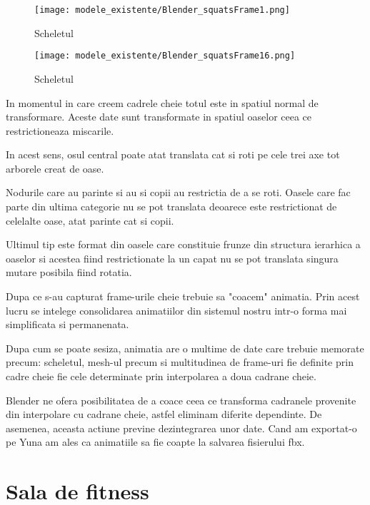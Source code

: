 \documentclass[12pt,a4paper]{report}
\begin{document}
\begin{figure}[th]
\centering
\texttt{[image: modele\_existente/Blender\_squatsFrame1.png]}
  \caption[Scheletul]{Scheletul\protect\footnotemark}
  \label{figure_1:picture_10}
\end{figure}

\begin{figure}[th]
\centering
\texttt{[image: modele\_existente/Blender\_squatsFrame16.png]}
  \caption[Scheletul]{Scheletul\protect\footnotemark}
  \label{figure_1:picture_10}
\end{figure}


In momentul in care creem cadrele cheie totul este in spatiul normal de transformare. Aceste date sunt transformate in spatiul oaselor ceea ce restrictioneaza miscarile. 

In acest sens, osul central poate atat translata cat si roti pe cele trei axe tot arborele creat de oase. 

Nodurile care au parinte si au si copii au restrictia de a se roti. Oasele care fac parte din ultima categorie nu se pot translata deoarece este restrictionat de celelalte oase, atat parinte cat si copii. 

Ultimul tip este format din oasele care constituie frunze din structura ierarhica a oaselor si acestea fiind restrictionate la un capat nu se pot translata singura mutare posibila fiind rotatia.

Dupa ce s-au capturat frame-urile cheie trebuie sa "coacem" animatia. Prin acest lucru se intelege consolidarea animatiilor din sistemul nostru intr-o forma mai simplificata si permanenata. 

Dupa cum se poate sesiza, animatia are o multime de date care trebuie memorate precum: scheletul, mesh-ul precum si multitudinea de frame-uri fie definite prin cadre cheie fie cele determinate prin interpolarea a doua cadrane cheie.

Blender ne ofera posibilitatea de a coace ceea ce transforma cadranele provenite din interpolare cu cadrane cheie, astfel eliminam diferite dependinte. De asemenea, aceasta actiune previne dezintegrarea unor date. Cand am exportat-o pe Yuna am ales ca animatiile sa fie coapte la salvarea fisierului fbx.

\section{Sala de fitness}
\end{document}
